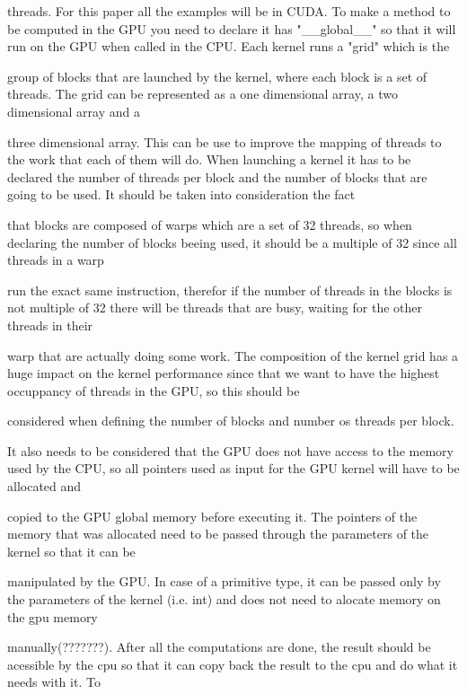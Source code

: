 \documentclass[runningheads]{llncs}
\begin{document}
threads.
\newline
For this paper all the examples will be in CUDA.
\newline
To make a method to be computed in the GPU you need to declare it has "\_\_global\_\_" so that it will run on the GPU when called in the CPU. Each kernel runs a "grid" which is the 

group of blocks that are launched by the kernel, where each block is a set of threads. The grid can be represented as a one dimensional array, a two dimensional array and a 

three dimensional array. This can be use to improve the mapping of threads to the work that each of them will do. 
\newline
When launching a kernel it has to be declared the number of threads per block and the number of blocks that are going to be used. It should be taken into consideration the fact 

that blocks are composed of warps which are a set of 32 threads, so when declaring the number of blocks beeing used, it should be a multiple of 32 since all threads in a warp 

run the exact same instruction, therefor if the number of threads in the blocks is not multiple of 32 there will be threads that are busy, waiting for the other threads in their 

warp that are actually doing some work.
\newline
The composition of the kernel grid has a huge impact on the kernel performance since that we want to have the highest occuppancy of threads in the GPU, so this should be 

considered when defining the number of blocks and number os threads per block.

\newline
It also needs to be considered that the GPU does not have access to the memory used by the CPU, so all pointers used as input for the GPU kernel will have to be allocated and 

copied to the GPU global memory before executing it. The pointers of the memory that was allocated need to be passed through the parameters of the kernel so that it can be 

manipulated by the GPU. In case of a primitive type, it can be passed only by the parameters of the kernel (i.e. int) and does not need to alocate memory on the gpu memory 

manually(???????). After all the computations are done, the result should be acessible by the cpu so that it can copy back the result to the cpu and do what it needs with it. To 
\end{document}
